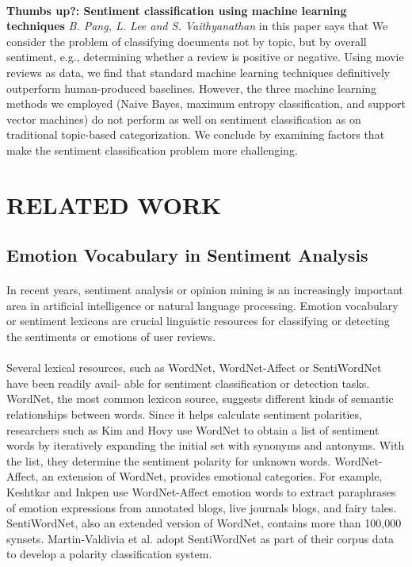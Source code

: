 \documentclass[a4paper,12pt,oneside]{article}
\begin{document}
\paragraph{}
\textbf{Thumbs up?: Sentiment classification using machine learning techniques} 
\textit{B. Pang, L. Lee and S. Vaithyanathan} in this paper says that
We consider the problem of classifying documents not by topic, but by overall sentiment, e.g., determining whether a review is positive or negative. Using movie reviews as data, we find that standard machine learning techniques definitively outperform human-produced baselines. However, the three machine learning methods we employed (Naive Bayes, maximum entropy classification, and support vector machines) do not perform as well on sentiment classification as on traditional topic-based categorization. We conclude by examining factors that make the sentiment classification problem more challenging.

\newpage
\section{RELATED WORK}
\subsection{Emotion Vocabulary in Sentiment Analysis}
\paragraph{}
In recent years, sentiment analysis or opinion mining is an increasingly important area in artificial intelligence or natural language processing. Emotion vocabulary or sentiment lexicons are crucial linguistic resources for classifying or detecting the sentiments or emotions of user reviews.
\paragraph{}
Several lexical resources, such as WordNet, WordNet-Affect or SentiWordNet  have been readily avail- able for sentiment classification or detection tasks. WordNet, the most common lexicon source, suggests different kinds of semantic relationships between words. Since it helps calculate sentiment polarities, researchers such as Kim and Hovy use WordNet to obtain a list of sentiment words by iteratively expanding the initial set with synonyms and antonyms. With the list, they determine the sentiment polarity for unknown words. WordNet-Affect, an extension of WordNet, provides emotional categories. For example, Keshtkar and Inkpen  use WordNet-Affect emotion words to extract paraphrases of emotion expressions from annotated blogs, live journals blogs, and fairy tales. SentiWordNet, also an extended version of WordNet, contains more than 100,000 synsets. Martin-Valdivia et al. adopt SentiWordNet as part of their corpus data to develop a polarity classification system.
\end{document}
